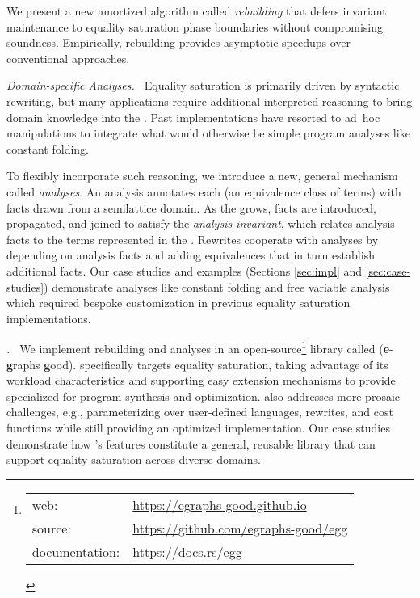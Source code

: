 We present a new amortized algorithm
  called \textit{rebuilding} that defers \egraph invariant maintenance
  to equality saturation phase boundaries without compromising soundness.
Empirically, rebuilding provides asymptotic speedups
  over conventional approaches.

\textit{Domain-specific Analyses. $\,$}
%
Equality saturation is primarily driven by syntactic rewriting,
  but many applications require additional interpreted reasoning
  to bring domain knowledge into the \egraph.
Past implementations have resorted to
  ad~hoc \egraph manipulations
  to integrate what would otherwise be
  simple program analyses like constant folding.

To flexibly incorporate such reasoning,
  we introduce a new, general mechanism called \textit{\eclass analyses}.
An \eclass analysis annotates each \eclass
  (an equivalence class of terms)
  with facts drawn from a semilattice domain.
As the \egraph grows,
  facts are introduced, propagated, and joined
  to satisfy the \textit{\eclass analysis invariant},
  which relates analysis facts to the terms represented in the \egraph.
Rewrites cooperate with \eclass analyses by
  depending on analysis facts and
  adding equivalences that in turn
  establish additional facts.
Our case studies and examples
  (Sections \ref{sec:impl} and \ref{sec:case-studies})
  demonstrate \eclass analyses like
  constant folding and free variable analysis
  which required bespoke customization in
  previous equality saturation implementations.

\textit{\Egg. $\,$}
%
We implement rebuilding and \eclass analyses in
  an open-source\footnote{
    \begin{tabular}[t]{ll}
      web: & \url{https://egraphs-good.github.io}\\
      source: & \url{https://github.com/egraphs-good/egg}\\
      documentation: & \url{https://docs.rs/egg}
    \end{tabular}
  }
  library called \egg (\textbf{e}-\textbf{g}raphs \textbf{g}ood).
\Egg specifically targets equality saturation,
  taking advantage of its workload characteristics and
  supporting easy extension mechanisms to
  provide \egraphs specialized for
  program synthesis and optimization.
\Egg also addresses more prosaic challenges,
  e.g., parameterizing over user-defined
  languages, rewrites, and cost functions
  while still providing an optimized implementation.
Our case studies demonstrate how \egg's features
  constitute a general, reusable \egraph library that can
  support equality saturation across diverse domains.

